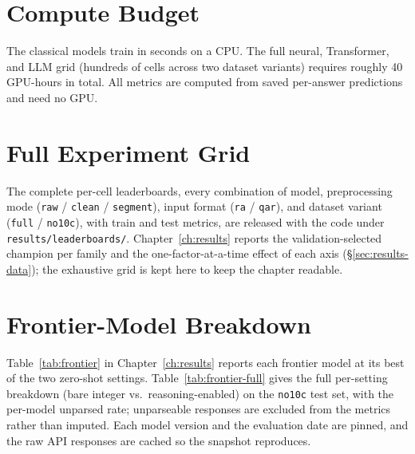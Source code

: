 \section{Compute Budget}
\label{app:compute}
The classical models train in seconds on a CPU. The full neural, Transformer, and LLM grid (hundreds
of cells across two dataset variants) requires roughly 40 GPU-hours in total. All metrics are
computed from saved per-answer predictions and need no GPU.

\section{Full Experiment Grid}
\label{app:grid}
The complete per-cell leaderboards, every combination of model, preprocessing mode (\texttt{raw} /
\texttt{clean} / \texttt{segment}), input format (\texttt{ra} / \texttt{qar}), and dataset variant
(\texttt{full} / \texttt{no10c}), with train and test metrics, are released with the code under
\texttt{results/leaderboards/}. Chapter~\ref{ch:results} reports the validation-selected champion per
family and the one-factor-at-a-time effect of each axis (\S\ref{sec:results-data}); the exhaustive grid
is kept here to keep the chapter readable.

\section{Frontier-Model Breakdown}
\label{app:frontier}
Table~\ref{tab:frontier} in Chapter~\ref{ch:results} reports each frontier model at its best of the
two zero-shot settings. Table~\ref{tab:frontier-full} gives the full per-setting breakdown (bare
integer vs.\ reasoning-enabled) on the \texttt{no10c} test set, with the per-model unparsed rate;
unparseable responses are excluded from the metrics rather than imputed. Each model version and the
evaluation date are pinned, and the raw API responses are cached so the snapshot reproduces.

